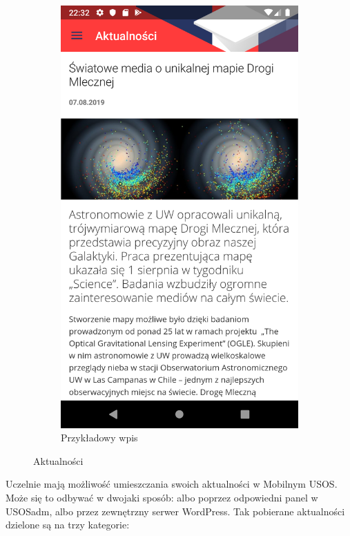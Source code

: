 \documentclass{pracamgr}
\begin{document}
\begin{figure}[p]
\begin{subfigure}[t]{0.3\textwidth}
		\includegraphics[width=\textwidth]{img/news_item.png}
		\caption{Przykładowy wpis}
		\label{fig:news_item}
	\end{subfigure}
	\caption{Aktualności}\label{fig:news}
	\medskip
\end{figure}

Uczelnie mają możliwość umieszczania swoich aktualności w Mobilnym USOS. Może się
to odbywać w dwojaki sposób: albo poprzez odpowiedni panel w USOSadm, albo przez
zewnętrzny serwer WordPress. Tak pobierane aktualności dzielone są na trzy kategorie:
\end{document}
